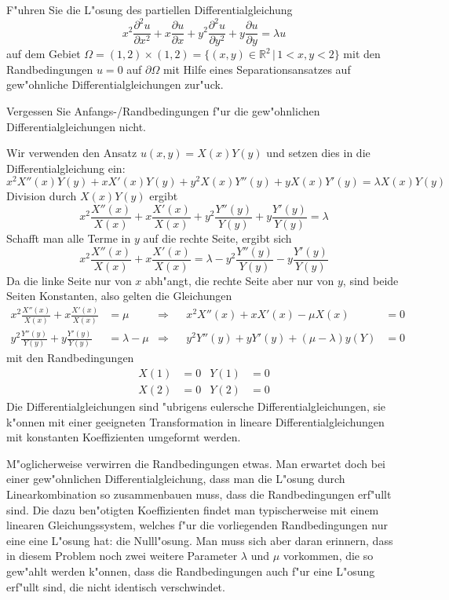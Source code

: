 F"uhren Sie die L"osung des partiellen Differentialgleichung
\[
x^2\frac{\partial^2 u}{\partial x^2}
+x\frac{\partial u}{\partial x}
+y^2\frac{\partial^2 u}{\partial y^2}
+y\frac{\partial u}{\partial y}
=\lambda u
\]
auf dem Gebiet
$\Omega=(1,2)\times(1,2)=\{ (x,y)\in\mathbb R^2\,|\, 1<x,y<2\}$
mit den Randbedingungen $u=0$ auf $\partial\Omega$
mit Hilfe eines Separationsansatzes auf gew"ohnliche Differentialgleichungen
zur"uck.

\begin{hinweis}
Vergessen Sie Anfangs-/Randbedingungen f"ur die gew"ohnlichen
Differentialgleichungen nicht.
\end{hinweis}

\begin{loesung}
Wir verwenden den Ansatz $u(x,y)=X(x)Y(y)$ und setzen dies in die
Differentialgleichung ein:
\[
x^2X''(x)Y(y)
+xX'(x)Y(y)
+y^2X(x)Y''(y)
+yX(x)Y'(y)=\lambda X(x)Y(y)
\]
Division durch $X(x)Y(y)$ ergibt
\[
x^2\frac{X''(x)}{X(x)}
+x\frac{X'(x)}{X(x)}
+y^2\frac{Y''(y)}{Y(y)}
+y\frac{Y'(y)}{Y(y)}=\lambda
\]
Schafft man alle Terme in $y$ auf die rechte Seite, ergibt sich
\[
x^2\frac{X''(x)}{X(x)}
+x\frac{X'(x)}{X(x)}
=
\lambda
-y^2\frac{Y''(y)}{Y(y)}
-y\frac{Y'(y)}{Y(y)}
\]
Da die linke Seite nur von $x$ abh"angt, die rechte Seite aber nur
von $y$, sind beide Seiten Konstanten, also gelten die
Gleichungen
\begin{align*}
x^2\frac{X''(x)}{X(x)}
+x\frac{X'(x)}{X(x)}&=\mu
&\Rightarrow&
&
x^2X''(x)+xX'(x)-\mu X(x)&=0
\\
y^2\frac{Y''(y)}{Y(y)}
+y\frac{Y'(y)}{Y(y)}&=\lambda-\mu
&\Rightarrow&
&
y^2Y''(y)+yY'(y)+(\mu-\lambda) y(Y)&=0
\end{align*}
mit den Randbedingungen
\begin{align*}
X(1)&=0&Y(1)&=0\\
X(2)&=0&Y(2)&=0
\end{align*}
Die Differentialgleichungen sind "ubrigens eulersche Differentialgleichungen,
sie k"onnen mit einer geeigneten Transformation in lineare
Differentialgleichungen mit konstanten Koeffizienten umgeformt werden.
\end{loesung}

\begin{diskussion}
M"oglicherweise verwirren die Randbedingungen etwas.
Man erwartet doch bei einer gew"ohnlichen Differentialgleichung, dass
man die L"osung durch Linearkombination so zusammenbauen muss, dass die
Randbedingungen erf"ullt sind.
Die dazu ben"otigten Koeffizienten findet man typischerweise mit einem
linearen Gleichungssystem, welches f"ur die vorliegenden Randbedingungen
nur eine eine L"osung hat: die Nulll"osung.
Man muss sich aber daran erinnern, dass in diesem Problem noch zwei weitere
Parameter $\lambda$ und $\mu$ vorkommen, die so gew"ahlt werden k"onnen,
dass die Randbedingungen auch f"ur eine L"osung erf"ullt sind, die nicht
identisch verschwindet.
\end{diskussion}
